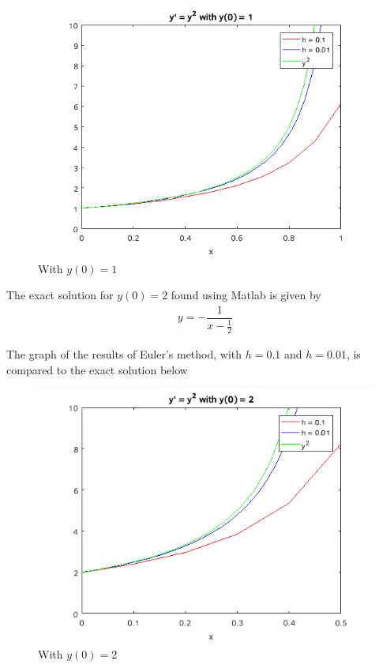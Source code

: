 \documentclass[a4paper,12pt]{article}
\begin{document}
\begin{enumerate}[I.]
\begin{enumerate}[a)]
      \begin{figure}[H]
        \begin{center}
          \includegraphics[scale=.9]{211.png}
          \caption{With $y(0) = 1$}
        \end{center}
      \end{figure}
            
      The exact solution for $y(0)=2$ found using Matlab is given by
      \begin{align*}
        y=-\dfrac{1}{x - \frac{1}{2}}
      \end{align*}

      The graph of the results of Euler's method, with $h=0.1$ and $h=0.01$, is compared to the exact solution below
      
            \begin{figure}[H]
              \begin{center}
                \includegraphics[scale=.9]{212.png}
                \caption{With $y(0) = 2$}
              \end{center}
            \end{figure}
            

\end{enumerate}
\end{enumerate}
\end{document}
